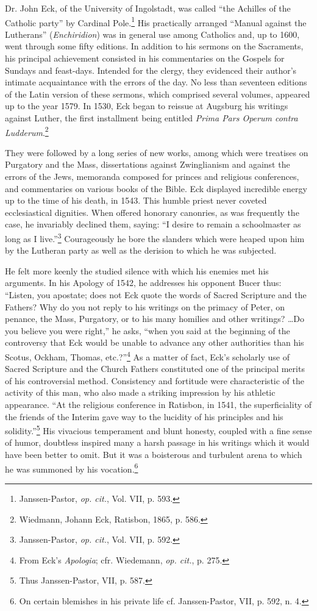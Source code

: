 Dr. John Eck, of the University of Ingolstadt, was called “the
Achilles of the Catholic party” by Cardinal Pole.\footnote{Janssen-Pastor, \textit{op. cit.}, Vol. VII, p. 593.}
 His practically arranged
“Manual against the Lutherans” (\textit{Enchiridion}) was in general
use among Catholics and, up to 1600, went through some fifty editions.
In addition to his sermons on the Sacraments, his principal
achievement consisted in his commentaries on the Gospels for Sundays
and feast-days. Intended for the clergy, they evidenced their author’s
intimate acquaintance with the errors of the day. No less than
seventeen editions of the Latin version of these sermons, which comprised
several volumes, appeared up to the year 1579. In 1530, Eck
began to reissue at Augsburg his writings against Luther, the first
installment being entitled \textit{Prima Pars Operum contra Ludderum}.\footnote{Wiedmann, Johann Eck, Ratisbon, 1865, p. 586.}

They were followed by a long series of new works, among which were
treatises on Purgatory and the Mass, dissertations against Zwinglianism
and against the errors of the Jews, memoranda composed for
princes and religious conferences, and commentaries on various books
of the Bible. Eck displayed incredible energy up to the time of his
death, in 1543. This humble priest never coveted ecclesiastical dignities.
When offered honorary canonries, as was frequently the case, he
invariably declined them, saying: “I desire to remain a schoolmaster
as long as I live.”\footnote{Janssen-Pastor, \textit{op. cit.}, Vol. VII, p. 592.}
 Courageously he bore the slanders which were
heaped upon him by the Lutheran party as well as the derision to
which he was subjected.

He felt more keenly the studied silence with which his enemies met
his arguments. In his Apology of 1542, he addresses his opponent
Bucer thus: “Listen, you apostate; does not Eck quote the words of
Sacred Scripture and the Fathers? Why do you not reply to his writings
on the primacy of Peter, on penance, the Mass, Purgatory, or to
his many homilies and other writings? \dots Do you believe you were
right,” he asks, “when you said at the beginning of the controversy
that Eck would be unable to advance any other authorities than his
Scotus, Ockham, Thomas, etc.?”\footnote{From Eck’s \textit{Apologia}; cfr. Wiedemann, \textit{op. cit.}, p. 275.}
 As a matter of fact, Eck’s
scholarly use of Sacred Scripture and the Church Fathers constituted
one of the principal merits of his controversial method. Consistency
and fortitude were characteristic of the activity of this man, who
also made a striking impression by his athletic appearance. “At the
religious conference in Ratisbon, in 1541, the superficiality of the
friends of the Interim gave way to the lucidity of his principles and
his solidity.”\footnote{Thus Janssen-Pastor, VII, p. 587.}
 His vivacious temperament and blunt honesty, coupled
with a fine sense of humor, doubtless inspired many a harsh passage in
his writings which it would have been better to omit. But it was a
boisterous and turbulent arena to which he was summoned by his
vocation.\footnote{On certain blemishes in his private life cf. Janssen-Pastor, VII, p. 592, n. 4.}

